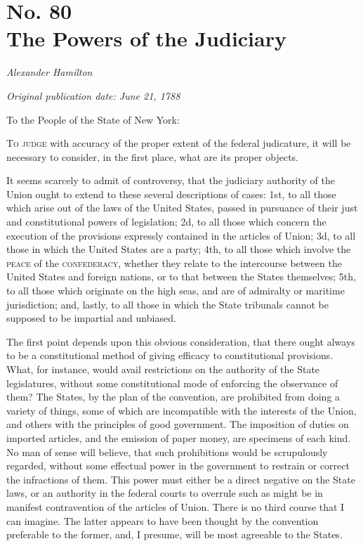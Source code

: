 \chapter[No. 80: The Powers of the Judiciary]{No. 80\\ {\small The Powers of the Judiciary}}

\textit{Alexander Hamilton}

\textit{Original publication date: June 21, 1788}
\vspace{1cm}

To the People of the State of New York:
\vspace{.4cm}

\textsc{To judge} with accuracy of the proper extent of the federal judicature, it will be necessary to consider, in the first place, what are its proper objects.

It seems scarcely to admit of controversy, that the judiciary authority of the Union ought to extend to these several descriptions of cases: 1st, to all those which arise out of the laws of the United States, passed in pursuance of their just and constitutional powers of legislation; 2d, to all those which concern the execution of the provisions expressly contained in the articles of Union; 3d, to all those in which the United States are a party; 4th, to all those which involve the \textsc{peace} of the \textsc{confederacy}, whether they relate to the intercourse between the United States and foreign nations, or to that between the States themselves; 5th, to all those which originate on the high seas, and are of admiralty or maritime jurisdiction; and, lastly, to all those in which the State tribunals cannot be supposed to be impartial and unbiased.

The first point depends upon this obvious consideration, that there ought always to be a constitutional method of giving efficacy to constitutional provisions. 
What, for instance, would avail restrictions on the authority of the State legislatures, without some constitutional mode of enforcing the observance of them? 
The States, by the plan of the convention, are prohibited from doing a variety of things, some of which are incompatible with the interests of the Union, and others with the principles of good government. 
The imposition of duties on imported articles, and the emission of paper money, are specimens of each kind. 
No man of sense will believe, that such prohibitions would be scrupulously regarded, without some effectual power in the government to restrain or correct the infractions of them. 
This power must either be a direct negative on the State laws, or an authority in the federal courts to overrule such as might be in manifest contravention of the articles of Union. 
There is no third course that I can imagine. 
The latter appears to have been thought by the convention preferable to the former, and, I presume, will be most agreeable to the States.

